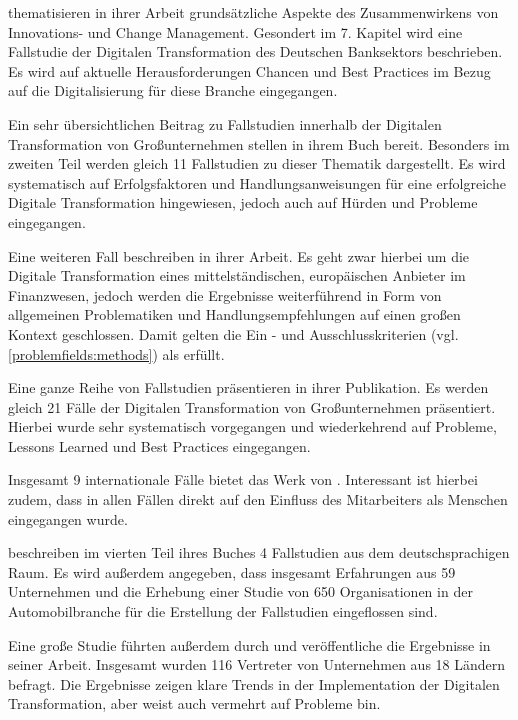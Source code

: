  thematisieren in ihrer Arbeit grundsätzliche Aspekte des Zusammenwirkens von Innovations- und Change Management. Gesondert im 7. Kapitel wird eine Fallstudie der Digitalen Transformation des Deutschen Banksektors  beschrieben. Es wird auf aktuelle Herausforderungen Chancen und Best Practices im Bezug auf die Digitalisierung für diese Branche eingegangen.

Ein sehr übersichtlichen Beitrag zu Fallstudien innerhalb der Digitalen Transformation von Großunternehmen stellen  in ihrem Buch bereit. Besonders im zweiten Teil werden gleich 11  Fallstudien zu dieser Thematik dargestellt. Es wird systematisch auf Erfolgsfaktoren und Handlungsanweisungen für  eine erfolgreiche Digitale Transformation hingewiesen, jedoch auch auf Hürden und Probleme eingegangen.

Eine weiteren Fall beschreiben  in ihrer Arbeit. Es geht zwar hierbei um die Digitale Transformation eines mittelständischen, europäischen Anbieter im Finanzwesen, jedoch werden die Ergebnisse weiterführend in Form von allgemeinen Problematiken und Handlungsempfehlungen auf einen großen Kontext geschlossen. Damit gelten die Ein - und Ausschlusskriterien (vgl. \ref{problemfields:methods}) als erfüllt.

Eine ganze Reihe von Fallstudien präsentieren  in ihrer Publikation. Es werden gleich 21 Fälle der Digitalen Transformation von Großunternehmen präsentiert. Hierbei wurde sehr systematisch vorgegangen und  wiederkehrend auf Probleme, Lessons Learned und Best Practices eingegangen.

Insgesamt 9 internationale Fälle bietet das Werk von . Interessant ist hierbei  zudem, dass in allen Fällen direkt auf den Einfluss des Mitarbeiters als Menschen eingegangen wurde.

 beschreiben im vierten Teil ihres Buches 4 Fallstudien aus dem deutschsprachigen Raum. Es wird außerdem angegeben, dass insgesamt Erfahrungen aus 59 Unternehmen und die Erhebung einer Studie von 650 Organisationen in der Automobilbranche für die Erstellung der Fallstudien eingeflossen sind.

Eine große Studie führten außerdem  durch und veröffentliche die Ergebnisse in seiner Arbeit. Insgesamt wurden 116 Vertreter von Unternehmen aus 18 Ländern befragt. Die Ergebnisse zeigen klare  Trends in der Implementation der Digitalen Transformation, aber weist auch vermehrt auf Probleme bin.

